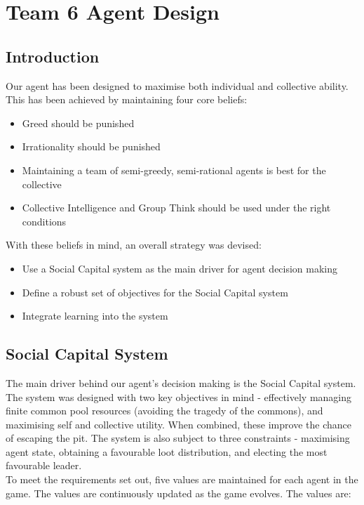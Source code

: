 \chapter{Team 6 Agent Design}\label{team_6_agent_design}

\section{Introduction}

Our agent has been designed to maximise both individual and collective ability. This has been achieved by maintaining four core beliefs:

\begin{itemize}
    \item Greed should be punished
    \item Irrationality should be punished
    \item Maintaining a team of semi-greedy, semi-rational agents is best for the collective
    \item Collective Intelligence and Group Think should be used under the right conditions
\end{itemize}
With these beliefs in mind, an overall strategy was devised:
\begin{itemize}
    \item Use a Social Capital system as the main driver for agent decision making
    \item Define a robust set of objectives for the Social Capital system
    \item Integrate learning into the system
\end{itemize}

\section{Social Capital System}

The main driver behind our agent's decision making is the Social Capital system. The system was designed with two key objectives in mind - effectively managing finite common pool resources (avoiding the tragedy of the commons), and maximising self and collective utility. When combined, these improve the chance of escaping the pit. The system is also subject to three constraints - maximising agent state, obtaining a favourable loot distribution, and electing the most favourable leader.\\

To meet the requirements set out, five values are maintained for each agent in the game. The values are continuously updated as the game evolves. The values are:

